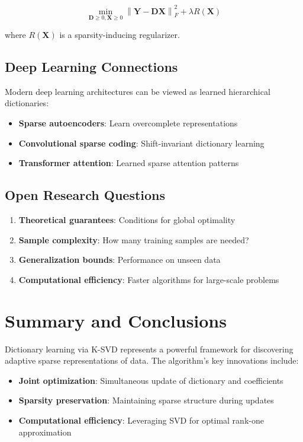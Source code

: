 \documentclass[12pt]{article}
\newcommand{\norm}[1]{\left\|#1\right\|}
\theoremstyle{definition}
\begin{document}
\begin{equation}
    \min_{\mathbf{D} \geq 0, \mathbf{X} \geq 0} \norm{\mathbf{Y} - \mathbf{D}\mathbf{X}}_F^2 + \lambda R(\mathbf{X})
\end{equation}

where $R(\mathbf{X})$ is a sparsity-inducing regularizer.

\subsection{Deep Learning Connections}

Modern deep learning architectures can be viewed as learned hierarchical dictionaries:

\begin{itemize}
    \item \textbf{Sparse autoencoders}: Learn overcomplete representations
    \item \textbf{Convolutional sparse coding}: Shift-invariant dictionary learning
    \item \textbf{Transformer attention}: Learned sparse attention patterns
\end{itemize}

\subsection{Open Research Questions}

\begin{enumerate}
    \item \textbf{Theoretical guarantees}: Conditions for global optimality
    \item \textbf{Sample complexity}: How many training samples are needed?
    \item \textbf{Generalization bounds}: Performance on unseen data
    \item \textbf{Computational efficiency}: Faster algorithms for large-scale problems
\end{enumerate}

\section{Summary and Conclusions}

Dictionary learning via K-SVD represents a powerful framework for discovering adaptive sparse representations of data. The algorithm's key innovations include:

\begin{itemize}
    \item \textbf{Joint optimization}: Simultaneous update of dictionary and coefficients
    \item \textbf{Sparsity preservation}: Maintaining sparse structure during updates
    \item \textbf{Computational efficiency}: Leveraging SVD for optimal rank-one approximation
\end{itemize}
\end{document}
